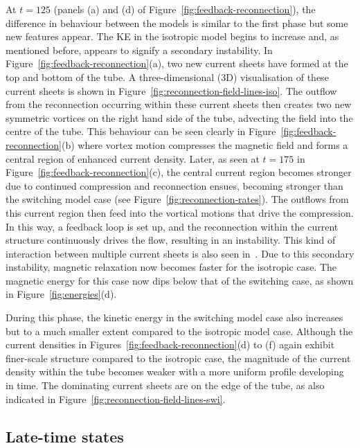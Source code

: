At $t=125$ (panels (a) and (d) of Figure~\ref{fig:feedback-reconnection}), the difference in behaviour
between the models is similar to the first phase but some new features
appear. The KE in the isotropic model begins to increase and, as
mentioned before, appears to signify a secondary instability. In
Figure~\ref{fig:feedback-reconnection}(a), two new current sheets have
formed at the top and bottom of the tube. A three-dimensional (3D)
visualisation of these current sheets is shown in
Figure~\ref{fig:reconnection-field-lines-iso}. The outflow from the
reconnection occurring within these current sheets then creates two
new symmetric vortices on the right hand side of the tube, advecting
the field into the centre of the tube. This behaviour can be seen
clearly in Figure~\ref{fig:feedback-reconnection}(b) where vortex
motion compresses the magnetic field and forms a central region of
enhanced current density. Later, as seen at $t=175$ in Figure~\ref{fig:feedback-reconnection}(c), the central current region becomes stronger due to continued compression and reconnection ensues, becoming stronger than the switching model case (see Figure~\ref{fig:reconnection-rates}). The outflows from this current region then feed into the vortical motions that drive the compression. In this way, a feedback loop is set up, and the reconnection within the current structure continuously drives the flow, resulting in an instability. This kind of interaction between multiple current sheets is also seen in~\cite{hoodCoronalHeatingMagnetic2009}. Due to this secondary instability, magnetic relaxation now becomes faster for the isotropic case. The magnetic energy for this case now dips below that of the switching case, as shown in Figure~\ref{fig:energies}(d).

During this phase, the kinetic energy in the switching model case also increases but to a much smaller extent compared to the isotropic model case. Although the current densities in Figures~\ref{fig:feedback-reconnection}(d) to (f) again exhibit finer-scale structure compared to the isotropic case, the magnitude of the current density within the tube becomes weaker with a more uniform profile developing in time. The dominating current sheets are on the edge of the tube, as also indicated in Figure~\ref{fig:reconnection-field-lines-swi}.

\subsection{Late-time states}

